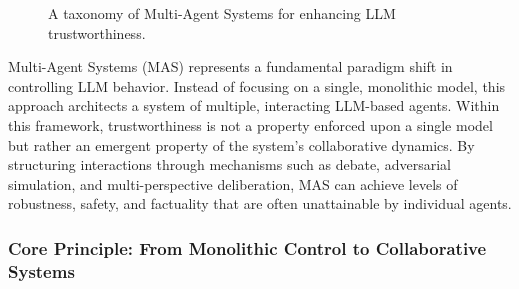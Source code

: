 \begin{figure}[htbp]
{%
    }
    \caption{A taxonomy of Multi-Agent Systems for enhancing LLM trustworthiness.}
    \label{fig:mas_taxonomy}
\end{figure}

Multi-Agent Systems (MAS) represents a fundamental paradigm shift in controlling LLM behavior. Instead of focusing on a single, monolithic model, this approach architects a system of multiple, interacting LLM-based agents. Within this framework, trustworthiness is not a property enforced upon a single model but rather an emergent property of the system's collaborative dynamics. By structuring interactions through mechanisms such as debate, adversarial simulation, and multi-perspective deliberation, MAS can achieve levels of robustness, safety, and factuality that are often unattainable by individual agents.

\subsubsection{Core Principle: From Monolithic Control to Collaborative Systems}

